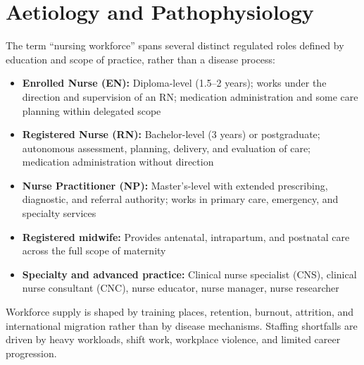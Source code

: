 \section*{Aetiology and Pathophysiology}
The term ``nursing workforce'' spans several distinct regulated roles defined by education and scope of practice, rather than a disease process:
\begin{itemize}
    \item \textbf{Enrolled Nurse (EN):} Diploma-level (1.5--2 years); works under the direction and supervision of an RN; medication administration and some care planning within delegated scope
    \item \textbf{Registered Nurse (RN):} Bachelor-level (3 years) or postgraduate; autonomous assessment, planning, delivery, and evaluation of care; medication administration without direction
    \item \textbf{Nurse Practitioner (NP):} Master's-level with extended prescribing, diagnostic, and referral authority; works in primary care, emergency, and specialty services
    \item \textbf{Registered midwife:} Provides antenatal, intrapartum, and postnatal care across the full scope of maternity
    \item \textbf{Specialty and advanced practice:} Clinical nurse specialist (CNS), clinical nurse consultant (CNC), nurse educator, nurse manager, nurse researcher
\end{itemize}
Workforce supply is shaped by training places, retention, burnout, attrition, and international migration rather than by disease mechanisms. Staffing shortfalls are driven by heavy workloads, shift work, workplace violence, and limited career progression.

